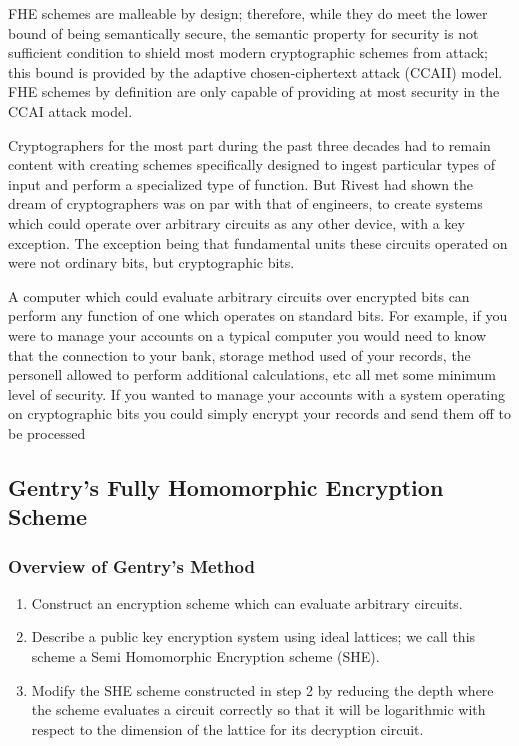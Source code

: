 \begin{nt}
    FHE schemes are malleable by design; therefore, while they do meet the lower bound of being semantically secure, the semantic property for security is not sufficient condition to shield most modern cryptographic schemes from attack; this bound is provided by the adaptive chosen-ciphertext attack (CCAII) model. FHE schemes by definition are only capable of providing at most security in the CCAI attack model. 
\begin{nt}
    
Cryptographers for the most part during the past three decades had to remain content with creating schemes specifically designed to ingest particular types of input and perform a specialized type of function. But Rivest had shown the dream of cryptographers was on par with that of engineers, to create systems which could operate over arbitrary circuits as any other device, with a key exception. The exception being that fundamental units these circuits operated on were not ordinary bits, but cryptographic bits.



A computer which could evaluate arbitrary circuits over encrypted bits can perform any function of one which operates on standard bits. For example, if you were to manage your accounts on a typical computer you would need to know that the connection to your bank, storage method used of your records, the personell allowed to perform additional calculations, etc all met some minimum level of security. If you wanted to manage your accounts with a system operating on cryptographic bits you could simply encrypt your records and send them off to be processed 




\subsection{Gentry's Fully Homomorphic Encryption Scheme}

\subsubsection{Overview of Gentry's Method}

\begin{enumerate}
	\item Construct an encryption scheme which can evaluate arbitrary circuits.
	\item Describe a public key encryption system using ideal lattices; we call this scheme a Semi Homomorphic Encryption scheme (SHE).
	\item Modify the SHE scheme constructed in step 2 by reducing the depth where the scheme evaluates a circuit correctly so that it will be logarithmic with respect to the dimension of the lattice for its decryption circuit. 
\end{enumerate}


\end{nt}
\end{nt}
